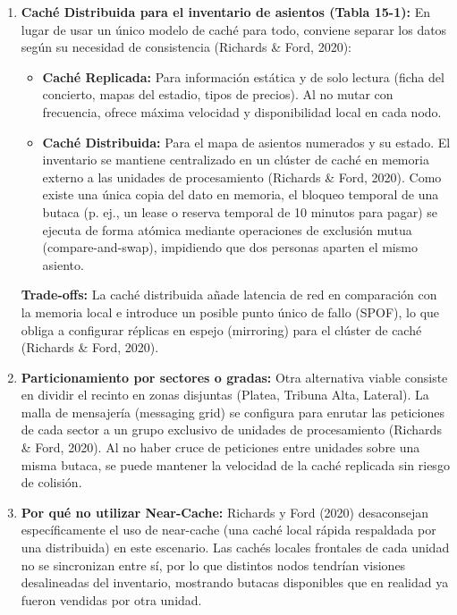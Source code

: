 \documentclass[12pt, a4paper]{article}
\begin{document}
    \begin{enumerate}[label=\alph*)]
    \item \textbf{Caché Distribuida para el inventario de asientos (Tabla 15-1):} En lugar de usar un único modelo de caché para todo, conviene separar los datos según su necesidad de consistencia (Richards \& Ford, 2020):
        \begin{itemize}
        \item \textbf{Caché Replicada:} Para información estática y de solo lectura (ficha del concierto, mapas del estadio, tipos de precios). Al no mutar con frecuencia, ofrece máxima velocidad y disponibilidad local en cada nodo.
        \item \textbf{Caché Distribuida:} Para el mapa de asientos numerados y su estado. El inventario se mantiene centralizado en un clúster de caché en memoria externo a las unidades de procesamiento (Richards \& Ford, 2020). Como existe una única copia del dato en memoria, el bloqueo temporal de una butaca (p. ej., un lease o reserva temporal de 10 minutos para pagar) se ejecuta de forma atómica mediante operaciones de exclusión mutua (compare-and-swap), impidiendo que dos personas aparten el mismo asiento.
        \end{itemize}

    \textbf{Trade-offs:} La caché distribuida añade latencia de red en comparación con la memoria local e introduce un posible punto único de fallo (SPOF), lo que obliga a configurar réplicas en espejo (mirroring) para el clúster de caché (Richards \& Ford, 2020).
    \item \textbf{Particionamiento por sectores o gradas:} Otra alternativa viable consiste en dividir el recinto en zonas disjuntas (Platea, Tribuna Alta, Lateral). La malla de mensajería (messaging grid) se configura para enrutar las peticiones de cada sector a un grupo exclusivo de unidades de procesamiento (Richards \& Ford, 2020). Al no haber cruce de peticiones entre unidades sobre una misma butaca, se puede mantener la velocidad de la caché replicada sin riesgo de colisión.
    \item \textbf{Por qué no utilizar Near-Cache:} Richards y Ford (2020) desaconsejan específicamente el uso de near-cache (una caché local rápida respaldada por una distribuida) en este escenario. Las cachés locales frontales de cada unidad no se sincronizan entre sí, por lo que distintos nodos tendrían visiones desalineadas del inventario, mostrando butacas disponibles que en realidad ya fueron vendidas por otra unidad.
    \end{enumerate}
\end{document}
